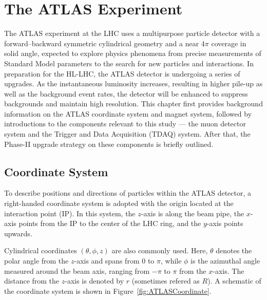 \chapter{The ATLAS Experiment} \label{ch:ATLAS} 
The ATLAS experiment at the LHC uses a multipurpose particle detector with a forward–backward symmetric cylindrical geometry and a near 4$\pi$ coverage in solid angle, expected to explore physics phenomena from precise measurements of Standard Model parameters to the search for new particles and interactions. In preparation for the HL-LHC, the ATLAS detector is undergoing a series of upgrades. As the instantaneous luminosity increases, resulting in higher pile-up as well as the background event rates, the detector will be enhanced to suppress backgrounds and maintain high resolution. This chapter first provides background information on the ATLAS coordinate system and magnet system, followed by introductions to the components relevant to this study --- the muon detector system and the Trigger and Data Acquisition (TDAQ) system. After that, the Phase-II upgrade strategy on these components is briefly outlined.
\section{Coordinate System} \label{sec:CoordinateSystem}
To describe positions and directions of particles within the ATLAS detector, a right-handed coordinate system is adopted with the origin located at the interaction point (IP). In this system, the \(z\)-axis is along the beam pipe, the \(x\)-axis points from the IP to the center of the LHC ring, and the \(y\)-axis points upwards.

Cylindrical coordinates \((\theta, \phi, z)\) are also commonly used. Here, \(\theta\) denotes the polar angle from the \(z\)-axis and spans from \(0\) to \(\pi\), while \(\phi\) is the azimuthal angle measured around the beam axis, ranging from \(-\pi\) to \(\pi\) from the \(x\)-axis. The distance from the \(z\)-axis is denoted by \(r\) (sometimes refered as \(R\)). A schematic of the coordinate system is shown in Figure~\ref{fig:ATLASCoordinate}.

